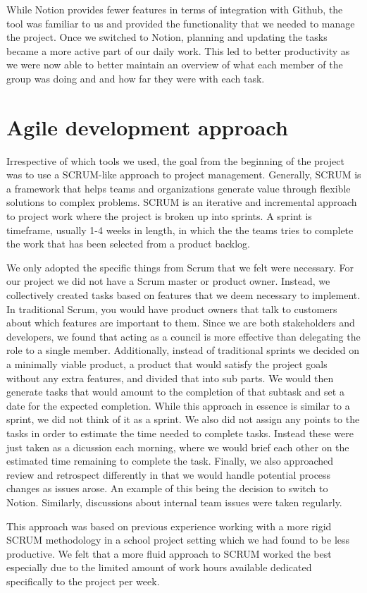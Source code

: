 While Notion provides fewer features in terms of integration with Github, the tool was familiar to us and provided the functionality that we needed to manage the project.
Once we switched to Notion, planning and updating the tasks became a more active part of our daily work. This led to better productivity as we were now able to better maintain an overview of what each member of the group was doing and and how far they were with each task.

\section{Agile development approach} \label{sec:agile-dev}
Irrespective of which tools we used, the goal from the beginning of the project was to use a SCRUM-like approach to project management. 
Generally, SCRUM is a framework that helps teams and organizations generate value through flexible solutions to complex problems. SCRUM is an iterative and incremental approach to project work where the project is broken up into sprints. A sprint is timeframe, usually 1-4 weeks in length, in which the the teams tries to complete the work that has been selected from a product backlog.

We only adopted the specific things from Scrum that we felt were necessary. For our project we did not have a Scrum master or product owner. Instead, we collectively created tasks based on features that we deem necessary to implement.
In traditional Scrum, you would have product owners that talk to customers about which features are important to them. Since we are both stakeholders and developers, we found that acting as a council is more effective than delegating the role to a single member.
Additionally, instead of traditional sprints we decided on a minimally viable product, a product that would satisfy the project goals without any extra features, and divided that into sub parts. We would then generate tasks that would amount to the completion of that subtask and set a date for the expected completion. While this approach in essence is similar to a sprint, we did not think of it as a sprint. 
We also did not assign any points to the tasks in order to estimate the time needed to complete tasks. Instead these were just taken as a dicussion each morning, where we would brief each other on the estimated time remaining to complete the task.
Finally, we also approached review and retrospect differently in that we would handle potential process changes as issues arose. An example of this being the decision to switch to Notion. Similarly, discussions about internal team issues were taken regularly.

This approach was based on previous experience working with a more rigid SCRUM methodology in a school project setting which we had found to be less productive. We felt that a more fluid approach to SCRUM worked the best especially due to the limited amount of work hours available dedicated specifically to the project per week.



